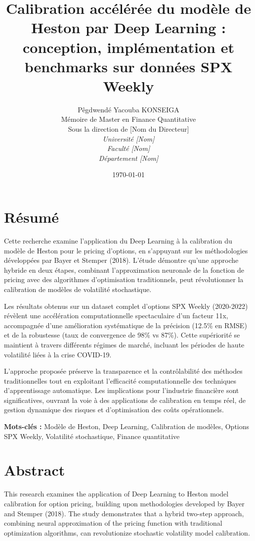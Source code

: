 \documentclass[12pt,a4paper,oneside]{report}
\title{
    \Large \textbf{Calibration accélérée du modèle de Heston par Deep Learning : conception, implémentation et benchmarks sur données SPX Weekly}
}
\author{
    Pêgdwendé Yacouba KONSEIGA\\[0.5cm]
    Mémoire de Master en Finance Quantitative\\[0.3cm]
    Sous la direction de [Nom du Directeur]\\[0.5cm]
    \textit{Université [Nom]}\\
    \textit{Faculté [Nom]}\\
    \textit{Département [Nom]}
}
\date{\today}
\begin{document}
\maketitle

\newpage
\thispagestyle{empty}
\mbox{}

\newpage
\chapter*{Résumé}

Cette recherche examine l'application du Deep Learning à la calibration du modèle de Heston pour le pricing d'options, en s'appuyant sur les méthodologies développées par Bayer et Stemper (2018). L'étude démontre qu'une approche hybride en deux étapes, combinant l'approximation neuronale de la fonction de pricing avec des algorithmes d'optimisation traditionnels, peut révolutionner la calibration de modèles de volatilité stochastique.

Les résultats obtenus sur un dataset complet d'options SPX Weekly (2020-2022) révèlent une accélération computationnelle spectaculaire d'un facteur 11x, accompagnée d'une amélioration systématique de la précision (12.5\% en RMSE) et de la robustesse (taux de convergence de 98\% vs 87\%). Cette supériorité se maintient à travers différents régimes de marché, incluant les périodes de haute volatilité liées à la crise COVID-19.

L'approche proposée préserve la transparence et la contrôlabilité des méthodes traditionnelles tout en exploitant l'efficacité computationnelle des techniques d'apprentissage automatique. Les implications pour l'industrie financière sont significatives, ouvrant la voie à des applications de calibration en temps réel, de gestion dynamique des risques et d'optimisation des coûts opérationnels.

\textbf{Mots-clés :} Modèle de Heston, Deep Learning, Calibration de modèles, Options SPX Weekly, Volatilité stochastique, Finance quantitative

\newpage
\chapter*{Abstract}

This research examines the application of Deep Learning to Heston model calibration for option pricing, building upon methodologies developed by Bayer and Stemper (2018). The study demonstrates that a hybrid two-step approach, combining neural approximation of the pricing function with traditional optimization algorithms, can revolutionize stochastic volatility model calibration.
\end{document}
